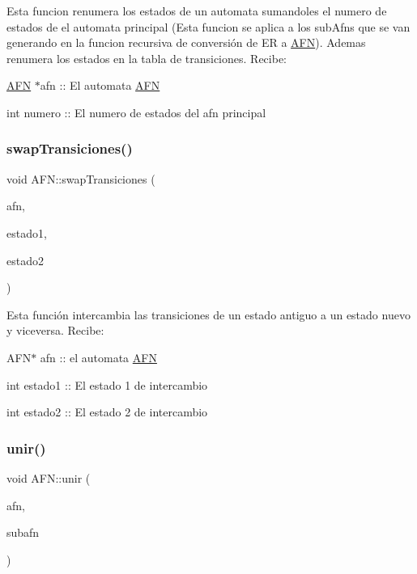Esta funcion renumera los estados de un automata sumandoles el numero de estados de el automata principal (Esta funcion se aplica a los sub\+Afn\textquotesingle{}s que se van generando en la funcion recursiva de conversión de ER a \hyperlink{class_a_f_n}{A\+FN}). Ademas renumera los estados en la tabla de transiciones. Recibe\+:
\begin{DoxyItemize}
\item \hyperlink{class_a_f_n}{A\+FN} $\ast$afn \+:\+: El automata \hyperlink{class_a_f_n}{A\+FN}
\item int numero \+:\+: El numero de estados del afn principal 
\end{DoxyItemize}\mbox{\label{class_a_f_n_af2804ad2f92e4a909fd9afffb64a47c4}} 
\subsubsection{\texorpdfstring{swap\+Transiciones()}{swapTransiciones()}}
{\footnotesize\ttfamily void A\+F\+N\+::swap\+Transiciones (\begin{DoxyParamCaption}\item[{\hyperlink{class_a_f_n}{A\+FN} $\ast$}]{afn,  }\item[{int}]{estado1,  }\item[{int}]{estado2 }\end{DoxyParamCaption})}

Esta función intercambia las transiciones de un estado antiguo a un estado nuevo y viceversa. Recibe\+:
\begin{DoxyItemize}
\item A\+F\+N$\ast$ afn \+:\+: el automata \hyperlink{class_a_f_n}{A\+FN}
\item int estado1 \+:\+: El estado 1 de intercambio
\item int estado2 \+:\+: El estado 2 de intercambio 
\end{DoxyItemize}\mbox{\label{class_a_f_n_ac4100292cd0b27797b1e4ee50266a079}} 
\subsubsection{\texorpdfstring{unir()}{unir()}}
{\footnotesize\ttfamily void A\+F\+N\+::unir (\begin{DoxyParamCaption}\item[{\hyperlink{class_a_f_n}{A\+FN} $\ast$}]{afn,  }\item[{\hyperlink{class_a_f_n}{A\+FN}}]{subafn }\end{DoxyParamCaption})}

